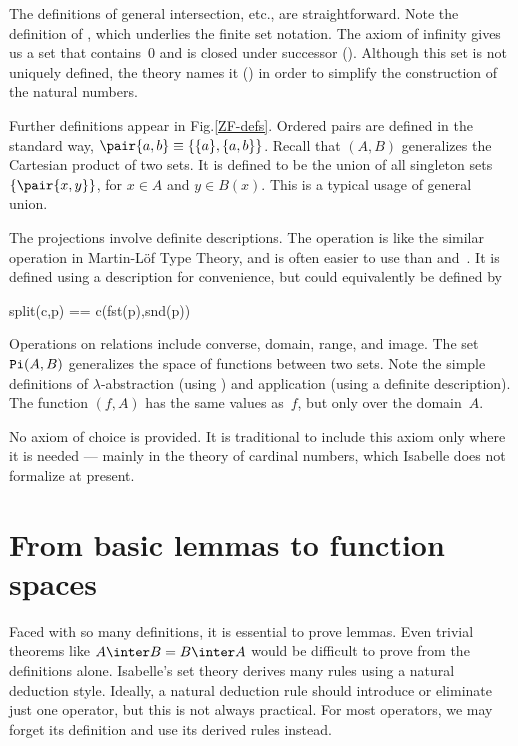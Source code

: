 The definitions of general intersection, etc., are straightforward.  Note
the definition of , which underlies the finite set notation.
The axiom of infinity gives us a set that contains~0 and is closed under
successor ().  Although this set is not uniquely defined,
the theory names it () in order to simplify the
construction of the natural numbers.
                                             
Further definitions appear in Fig.\ts\ref{ZF-defs}.  Ordered pairs are
defined in the standard way, $\pair{a,b}\equiv\{\{a\},\{a,b\}\}$.  Recall
that $(A,B)$ generalizes the Cartesian product of two
sets.  It is defined to be the union of all singleton sets
$\{\pair{x,y}\}$, for $x\in A$ and $y\in B(x)$.  This is a typical usage of
general union.

The projections involve definite descriptions.  The 
operation is like the similar operation in Martin-L\"of Type Theory, and is
often easier to use than  and~.  It is defined
using a description for convenience, but could equivalently be defined by
\begin{ttbox}
split(c,p) == c(fst(p),snd(p))
\end{ttbox}  
Operations on relations include converse, domain, range, and image.  The
set ${\tt Pi}(A,B)$ generalizes the space of functions between two sets.
Note the simple definitions of $\lambda$-abstraction (using
) and application (using a definite description).  The
function $(f,A)$ has the same values as~$f$, but only
over the domain~$A$.

No axiom of choice is provided.  It is traditional to include this axiom
only where it is needed --- mainly in the theory of cardinal numbers, which
Isabelle does not formalize at present.


\section{From basic lemmas to function spaces}
Faced with so many definitions, it is essential to prove lemmas.  Even
trivial theorems like $A\inter B=B\inter A$ would be difficult to prove
from the definitions alone.  Isabelle's set theory derives many rules using
a natural deduction style.  Ideally, a natural deduction rule should
introduce or eliminate just one operator, but this is not always practical.
For most operators, we may forget its definition and use its derived rules
instead.

